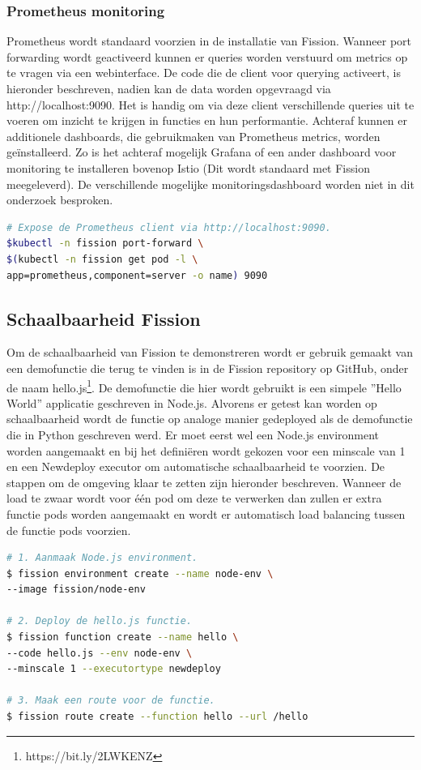 \subsubsection{Prometheus monitoring}
Prometheus wordt standaard voorzien in de installatie van Fission. Wanneer port forwarding wordt geactiveerd kunnen er queries worden verstuurd om metrics op te vragen via een webinterface. De code die de client voor querying activeert, is hieronder beschreven, nadien kan de data worden opgevraagd via http://localhost:9090. Het is handig om via deze client verschillende queries uit te voeren om inzicht te krijgen in functies en hun performantie. Achteraf kunnen er additionele dashboards, die gebruikmaken van Prometheus metrics, worden geïnstalleerd. Zo is het achteraf mogelijk Grafana of een ander dashboard voor monitoring te installeren bovenop Istio (Dit wordt standaard met Fission meegeleverd). De verschillende mogelijke monitoringsdashboard worden niet in dit onderzoek besproken.

\begin{lstlisting}[language=bash]
# Expose de Prometheus client via http://localhost:9090.
$kubectl -n fission port-forward \
$(kubectl -n fission get pod -l \
app=prometheus,component=server -o name) 9090
\end{lstlisting}

\subsection{Schaalbaarheid Fission}
Om de schaalbaarheid van Fission te demonstreren wordt er gebruik gemaakt van een demofunctie die terug te vinden is in de Fission repository op GitHub, onder de naam hello.js\footnote{https://bit.ly/2LWKENZ}. De demofunctie die hier wordt gebruikt is een simpele ''Hello World'' applicatie geschreven in Node.js. Alvorens er getest kan worden op schaalbaarheid wordt de functie op analoge manier gedeployed als de demofunctie die in Python geschreven werd. Er moet eerst wel een Node.js environment worden aangemaakt en bij het definiëren wordt gekozen voor een minscale van 1 en een Newdeploy executor om automatische schaalbaarheid te voorzien. De stappen om de omgeving klaar te zetten zijn hieronder beschreven. Wanneer de load te zwaar wordt voor één pod om deze te verwerken dan zullen er extra functie pods worden aangemaakt en wordt er automatisch load balancing tussen de functie pods voorzien.

\begin{lstlisting}[language=bash]
# 1. Aanmaak Node.js environment.
$ fission environment create --name node-env \
--image fission/node-env

# 2. Deploy de hello.js functie.
$ fission function create --name hello \
--code hello.js --env node-env \
--minscale 1 --executortype newdeploy

# 3. Maak een route voor de functie.
$ fission route create --function hello --url /hello
\end{lstlisting}

